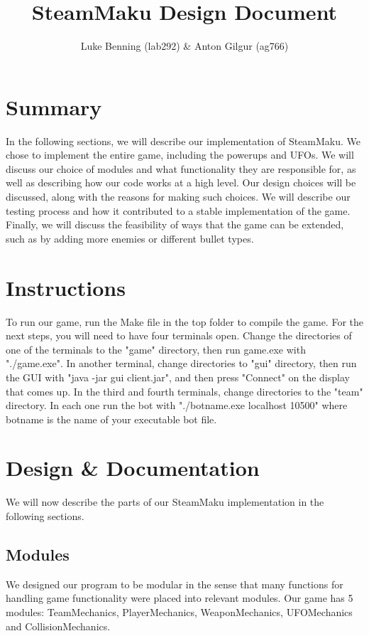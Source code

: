\documentclass{article}
\begin{document}
\title{SteamMaku Design Document}
\author{Luke Benning (lab292) \& Anton Gilgur (ag766)}

\maketitle

\section{Summary}
In the following sections, we will describe our implementation of SteamMaku. We chose to implement the entire game, including the powerups and UFOs. We will discuss our choice of modules and what functionality they are responsible for, as well as describing how our code works at a high level. Our design choices will be discussed, along with the reasons for making such choices. We will describe our testing process and how it contributed to a stable implementation of the game. Finally, we will discuss the feasibility of ways that the game can be extended, such as by adding more enemies or different bullet types.

\section{Instructions}
To run our game, run the Make file in the top folder to compile the game. For the next steps, you will need to have four terminals open. Change the directories of one of the terminals to the "game" directory, then run game.exe with "./game.exe". In another terminal, change directories to "gui" directory, then run the GUI with "java -jar gui client.jar", and then press "Connect" on the display that comes up. In the third and fourth terminals, change directories to the "team" directory. In each one run the bot with "./botname.exe localhost 10500" where botname is the name of your executable bot file.

\section{Design \& Documentation}
We will now describe the parts of our SteamMaku implementation in the following sections.

\subsection{Modules}
We designed our program to be modular in the sense that many functions for handling game functionality were placed into relevant modules.
Our game has 5 modules: TeamMechanics, PlayerMechanics, WeaponMechanics, UFOMechanics and CollisionMechanics.
\end{document}
